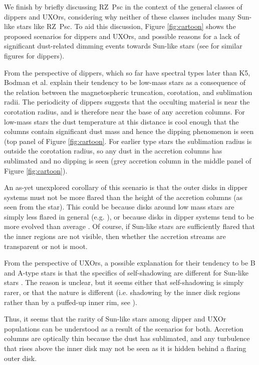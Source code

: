 \documentclass[]{rsos}
\begin{document}
We finish by briefly discussing RZ~Psc in the context of the general classes of dippers
and UXOrs, considering why neither of these classes includes many Sun-like stars like
RZ~Psc. To aid this discussion, Figure \ref{fig:cartoon} shows the proposed scenarios for
dippers and UXOrs, and possible reasons for a lack of significant dust-related dimming
events towards Sun-like stars (see \cite{2016arXiv160503985B} for similar figures for
dippers).

From the perspective of dippers, which so far have spectral types later than K5, Bodman
et al.  \cite{2016arXiv160503985B} explain their tendency to be low-mass stars as a
consequence of the relation between the magnetospheric truncation, corotation, and
sublimation radii. The periodicity of dippers suggests that the occulting material is
near the corotation radius, and is therefore near the base of any accretion columns. For
low-mass stars the dust temperature at this distance is cool enough that the columns
contain significant dust mass and hence the dipping phenomenon is seen (top panel of
Figure \ref{fig:cartoon}. For earlier type stars the sublimation radius is outside the
corotation radius, so any dust in the accretion columns has sublimated and no dipping is
seen (grey accretion column in the middle panel of Figure \ref{fig:cartoon}).

An as-yet unexplored corollary of this scenario is that the outer disks in dipper systems
must not be more flared than the height of the accretion columns (as seen from the
star). This could be because disks around low mass stars are simply less flared in
general (e.g. \cite{2010ApJ...720.1668S}), or because disks in dipper systems tend to
be more evolved than average \cite{2016ApJ...816...69A}. Of course, if Sun-like stars
are sufficiently flared that the inner regions are not visible, then whether the
accretion streams are transparent or not is moot.

From the perspective of UXOrs, a possible explanation for their tendency to be B and
A-type stars is that the specifics of self-shadowing are different for Sun-like stars
\cite{2003ApJ...594L..47D}. The reason is unclear, but it seems either that
self-shadowing is simply rarer, or that the nature is different (i.e. shadowing by the
inner disk regions rather than by a puffed-up inner rim, see
\cite{2004A&A...421.1075D,2007prpl.conf..555D}).

Thus, it seems that the rarity of Sun-like stars among dipper and UXOr populations can be
understood as a result of the scenarios for both. Accretion columns are optically thin
because the dust has sublimated, and any turbulence that rises above the inner disk may
not be seen as it is hidden behind a flaring outer disk.
\end{document}
